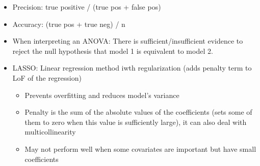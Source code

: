 \documentclass[8pt,landscape,a4paper, fleqn, dvipsnames]{extarticle}
\begin{document}
\begin{multicols*}{4}
\begin{itemize}
\begin{itemize}
    \end{itemize}
    \item Precision: true positive / (true pos + false pos)
    \item Accuracy: (true pos + true neg) / n
    \item When interpreting an ANOVA: There is sufficient/insufficient evidence to reject the null hypothesis that model 1 is equivalent to model 2.
    \item LASSO: Linear regression method iwth regularization (adds penalty term to LoF of the regression)
    \begin{itemize}
        \item Prevents overfitting and reduces model's variance
        \item Penalty is the sum of the absolute values of the coefficients (sets some of them to zero when this value is sufficiently large), it can also deal with multicollinearity
        \item May not perform well when some covariates are important but have small coefficients
    \end{itemize}
\end{itemize}


\end{multicols*}
\end{document}
